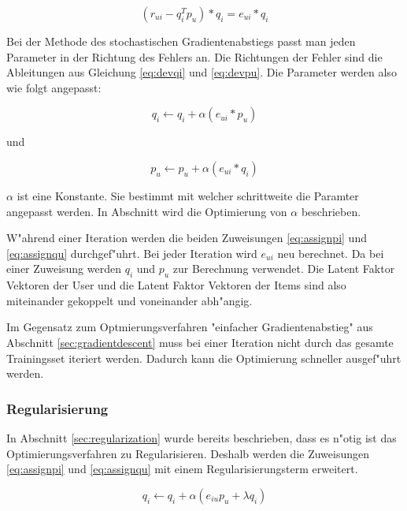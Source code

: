\documentclass[a4paper, 12pt]{article}
\begin{document}
\begin{equation}
  \label{eq:devpu}
    (r_{ui} - q_i^T p_u) * q_i =  e_{ui} * q_i
\end{equation}

Bei der Methode des stochastischen Gradientenabstiegs passt man jeden Parameter in der Richtung des Fehlers an. Die Richtungen der Fehler sind die Ableitungen aus Gleichung \ref{eq:devqi} und \ref{eq:devpu}. Die Parameter werden also wie folgt angepasst:

\begin{equation}
  \label{eq:assignpi}
 q_i \leftarrow q_i + \alpha (e_{ui} * p_u)
\end{equation}

und

\begin{equation}
  \label{eq:assignqu}
 p_u \leftarrow p_u + \alpha (e_{ui} * q_i)
\end{equation}

$\alpha$ ist eine Konstante. Sie bestimmt mit welcher schrittweite die Paramter angepasst werden. In Abschnitt \label{sec:results} wird die Optimierung von $\alpha$ beschrieben.

W"ahrend einer Iteration werden die beiden Zuweisungen \ref{eq:assignpi} und \ref{eq:assignqu} durchgef"uhrt. Bei jeder Iteration wird $e_{ui}$ neu berechnet. Da bei einer Zuweisung werden $q_i$ und $p_u$ zur Berechnung verwendet. Die Latent Faktor Vektoren der User und die Latent Faktor Vektoren der Items sind also miteinander gekoppelt und voneinander abh"angig.

Im Gegensatz zum Optmierungsverfahren "einfacher Gradientenabstieg" aus Abschnitt \ref{sec:gradientdescent} muss bei einer Iteration nicht durch das gesamte Trainingsset iteriert werden. Dadurch kann die Optimierung schneller ausgef"uhrt werden.

\subsubsection{Regularisierung}
\label{sec:regularization2}

In Abschnitt \ref{sec:regularization} wurde bereits beschrieben, dass es n"otig ist das Optimierungsverfahren zu Regularisieren. Deshalb werden die Zuweisungen \ref{eq:assignpi} und \ref{eq:assignqu} mit einem Regularisierungsterm erweitert.

\begin{equation}
  \label{eq:assign2}
  q_i \leftarrow q_i + \alpha (e_{iu} p_u + \lambda q_i)
\end{equation}
\end{document}
